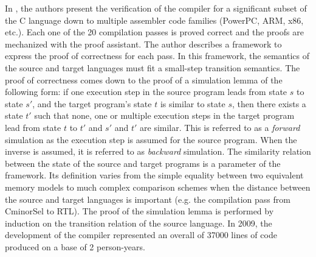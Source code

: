 \documentclass[pdflatex,sn-mathphys]{sn-jnl}%
\theoremstyle{thmstyleone}%
\theoremstyle{thmstyletwo}%
\theoremstyle{thmstylethree}%
\begin{document}
In \cite{Blazy2006, Leroy2009}, the authors present the verification
of the \ccert{} compiler for a significant subset of the C language
down to multiple assembler code families (PowerPC, ARM, x86,
etc.). Each one of the 20 compilation passes is proved correct and the
proofs are mechanized with the \coq{} proof assistant. The author
describes a framework to express the proof of correctness for each
pass. In this framework, the semantics of the source and target
languages must fit a small-step transition semantics. The proof of
correctness comes down to the proof of a simulation lemma of the
following form: if one execution step in the source program leads from
state $s$ to state $s'$, and the target program's state $t$ is similar
to state $s$, then there exists a state $t'$ such that none, one or
multiple execution steps in the target program lead from state $t$ to
$t'$ and $s'$ and $t'$ are similar. This is referred to as a
\textit{forward} simulation as the execution step is assumed for the
source program. When the inverse is assumed, it is referred to as
\textit{backward} simulation. The similarity relation between the
state of the source and target programs is a parameter of the
framework. Its definition varies from the simple equality between two
equivalent memory models to much complex comparison schemes when the
distance between the source and target languages is important
(e.g. the compilation pass from \textsf{CminorSel} to RTL). The proof
of the simulation lemma is performed by induction on the transition
relation of the source language. In 2009, the development of the
\ccert{} compiler represented an overall of 37000 lines of \coq{} code
produced on a base of 2 person-years.
\end{document}
